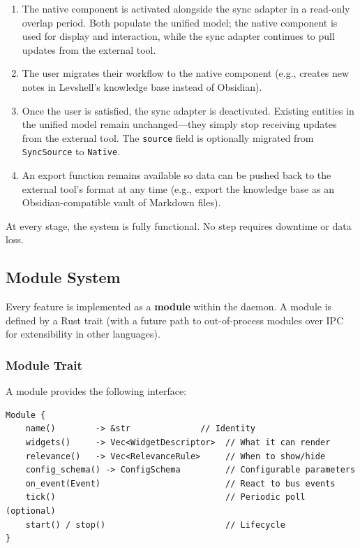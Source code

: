\documentclass[11pt,a4paper]{article}
\begin{document}
\begin{enumerate}[leftmargin=1.5em, itemsep=2pt]
  \item The native component is activated alongside the sync adapter in a read-only overlap period. Both populate the unified model; the native component is used for display and interaction, while the sync adapter continues to pull updates from the external tool.
  \item The user migrates their workflow to the native component (e.g., creates new notes in Levshell's knowledge base instead of Obsidian).
  \item Once the user is satisfied, the sync adapter is deactivated. Existing entities in the unified model remain unchanged---they simply stop receiving updates from the external tool. The \texttt{source} field is optionally migrated from \texttt{SyncSource} to \texttt{Native}.
  \item An export function remains available so data can be pushed back to the external tool's format at any time (e.g., export the knowledge base as an Obsidian-compatible vault of Markdown files).
\end{enumerate}

At every stage, the system is fully functional. No step requires downtime or data loss.


\subsection{Module System}
\label{sec:modules}

Every feature is implemented as a \textbf{module} within the daemon. A module is defined by a Rust trait (with a future path to out-of-process modules over IPC for extensibility in other languages).

\subsubsection{Module Trait}

A module provides the following interface:

\begin{lstlisting}[language={}]
Module {
    name()        -> &str              // Identity
    widgets()     -> Vec<WidgetDescriptor>  // What it can render
    relevance()   -> Vec<RelevanceRule>     // When to show/hide
    config_schema() -> ConfigSchema         // Configurable parameters
    on_event(Event)                         // React to bus events
    tick()                                  // Periodic poll (optional)
    start() / stop()                        // Lifecycle
}
\end{lstlisting}
\end{document}
